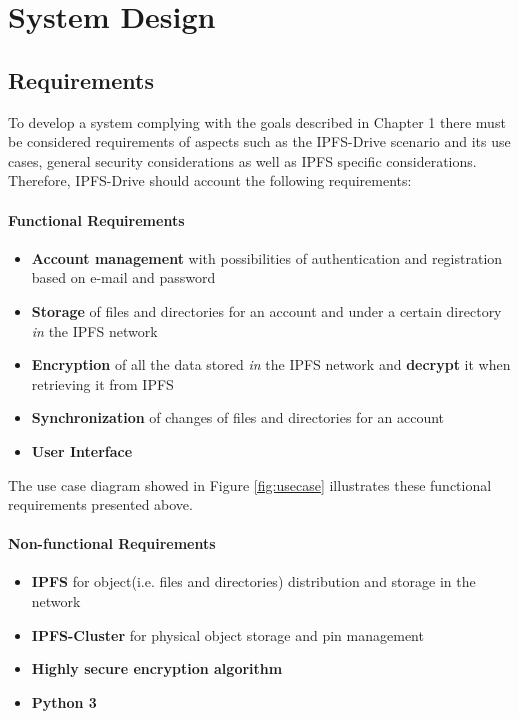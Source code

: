 \documentclass[12pt]{report}
\begin{document}
\chapter{System Design}

\section{Requirements}

To develop a system complying with the goals described in Chapter 1 there must be considered requirements of aspects such as the IPFS-Drive scenario and its use cases, general security considerations as well as IPFS specific considerations. Therefore, IPFS-Drive should account the following requirements:

\subsubsection{Functional Requirements}
\begin{itemize}
\item \textbf{Account management} with possibilities of authentication and registration based on e-mail and password
\item \textbf{Storage} of files and directories for an account and under a certain directory \textit{in} the IPFS network 
\item \textbf{Encryption} of all the data stored \textit{in} the IPFS network and \textbf{decrypt} it when retrieving it from IPFS 
\item \textbf{Synchronization} of changes of files and directories for an account
\item \textbf{User Interface} 
\end{itemize}

The use case diagram showed in Figure \ref{fig:usecase} illustrates these functional requirements presented above.

\subsubsection{Non-functional Requirements}
\begin{itemize}
\item \textbf{IPFS} for object(i.e. files and directories) distribution and storage in the network
\item \textbf{IPFS-Cluster} for physical object storage and pin management
\item \textbf{Highly secure encryption algorithm}
\item \textbf{Python 3}
\end{itemize}
\end{document}

